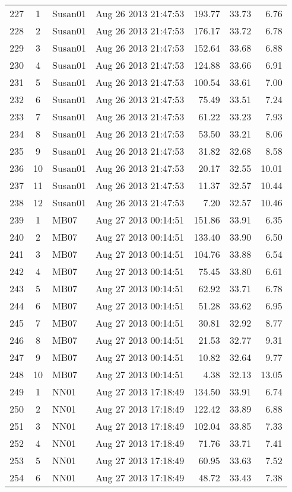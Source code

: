 \documentclass{article}
\begin{document}
\begin{longtable}{ccllrrr}
\hline 
227&1&Susan01&Aug 26 2013 21:47:53&193.77&33.73&6.76\\
228&2&Susan01&Aug 26 2013 21:47:53&176.17&33.72&6.78\\
229&3&Susan01&Aug 26 2013 21:47:53&152.64&33.68&6.88\\
230&4&Susan01&Aug 26 2013 21:47:53&124.88&33.66&6.91\\
231&5&Susan01&Aug 26 2013 21:47:53&100.54&33.61&7.00\\
232&6&Susan01&Aug 26 2013 21:47:53&75.49&33.51&7.24\\
233&7&Susan01&Aug 26 2013 21:47:53&61.22&33.23&7.93\\
234&8&Susan01&Aug 26 2013 21:47:53&53.50&33.21&8.06\\
235&9&Susan01&Aug 26 2013 21:47:53&31.82&32.68&8.58\\
236&10&Susan01&Aug 26 2013 21:47:53&20.17&32.55&10.01\\
237&11&Susan01&Aug 26 2013 21:47:53&11.37&32.57&10.44\\
238&12&Susan01&Aug 26 2013 21:47:53&7.20&32.57&10.46\\
\hline 
239&1&MB07&Aug 27 2013 00:14:51&151.86&33.91&6.35\\
240&2&MB07&Aug 27 2013 00:14:51&133.40&33.90&6.50\\
241&3&MB07&Aug 27 2013 00:14:51&104.76&33.88&6.54\\
242&4&MB07&Aug 27 2013 00:14:51&75.45&33.80&6.61\\
243&5&MB07&Aug 27 2013 00:14:51&62.92&33.71&6.78\\
244&6&MB07&Aug 27 2013 00:14:51&51.28&33.62&6.95\\
245&7&MB07&Aug 27 2013 00:14:51&30.81&32.92&8.77\\
246&8&MB07&Aug 27 2013 00:14:51&21.53&32.77&9.31\\
247&9&MB07&Aug 27 2013 00:14:51&10.82&32.64&9.77\\
248&10&MB07&Aug 27 2013 00:14:51&4.38&32.13&13.05\\
\hline 
249&1&NN01&Aug 27 2013 17:18:49&134.50&33.91&6.74\\
250&2&NN01&Aug 27 2013 17:18:49&122.42&33.89&6.88\\
251&3&NN01&Aug 27 2013 17:18:49&102.04&33.85&7.33\\
252&4&NN01&Aug 27 2013 17:18:49&71.76&33.71&7.41\\
253&5&NN01&Aug 27 2013 17:18:49&60.95&33.63&7.52\\
254&6&NN01&Aug 27 2013 17:18:49&48.72&33.43&7.38\\

\end{longtable}
\end{document}
